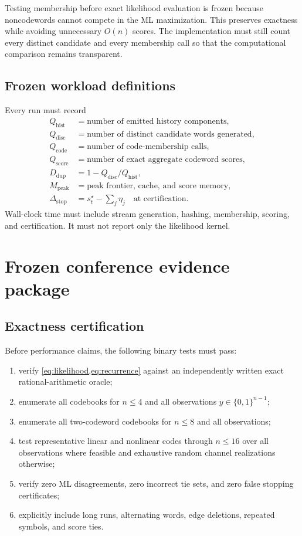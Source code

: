 \documentclass[11pt]{article}
\theoremstyle{definition}
\theoremstyle{remark}
\begin{document}
Testing membership before exact likelihood evaluation is frozen because noncodewords cannot compete in the ML maximization. This preserves exactness while avoiding unnecessary $O(n)$ scores. The implementation must still count every distinct candidate and every membership call so that the computational comparison remains transparent.

\subsection{Frozen workload definitions}

Every run must record
\begin{align*}
Q_{\mathrm{hist}}&=\text{number of emitted history components},\\
Q_{\mathrm{disc}}&=\text{number of distinct candidate words generated},\\
Q_{\mathrm{code}}&=\text{number of code-membership calls},\\
Q_{\mathrm{score}}&=\text{number of exact aggregate codeword scores},\\
D_{\mathrm{dup}}&=1-Q_{\mathrm{disc}}/Q_{\mathrm{hist}},\\
M_{\mathrm{peak}}&=\text{peak frontier, cache, and score memory},\\
\Delta_{\mathrm{stop}}&=s_t^\star-\sum_j\eta_j\quad\text{at certification}.
\end{align*}
Wall-clock time must include stream generation, hashing, membership, scoring, and certification. It must not report only the likelihood kernel.

\section{Frozen conference evidence package}

\subsection{Exactness certification}

Before performance claims, the following binary tests must pass:

\begin{enumerate}
  \item verify \cref{eq:likelihood,eq:recurrence} against an independently written exact rational-arithmetic oracle;
  \item enumerate all codebooks for $n\le4$ and all observations $y\in\{0,1\}^{n-1}$;
  \item enumerate all two-codeword codebooks for $n\le8$ and all observations;
  \item test representative linear and nonlinear codes through $n\le16$ over all observations where feasible and exhaustive random channel realizations otherwise;
  \item verify zero ML disagreements, zero incorrect tie sets, and zero false stopping certificates;
  \item explicitly include long runs, alternating words, edge deletions, repeated symbols, and score ties.
\end{enumerate}
\end{document}
